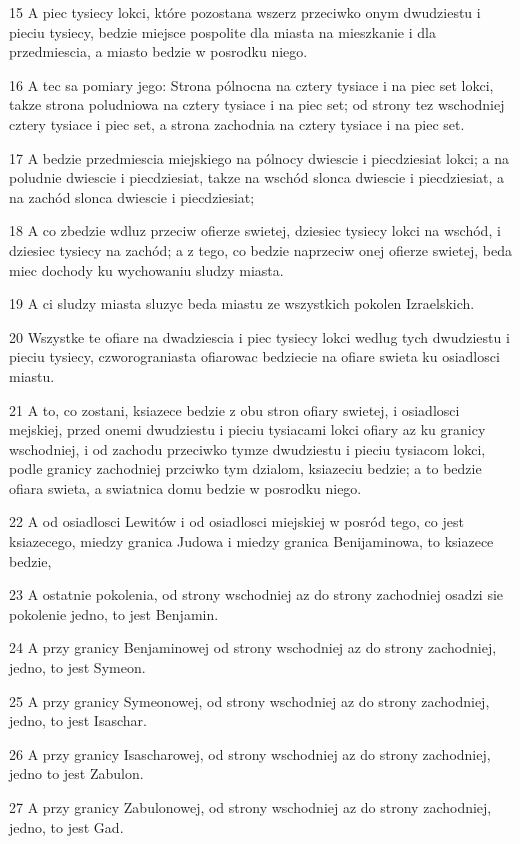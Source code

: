 \par 15 A piec tysiecy lokci, które pozostana wszerz przeciwko onym dwudziestu i pieciu tysiecy, bedzie miejsce pospolite dla miasta na mieszkanie i dla przedmiescia, a miasto bedzie w posrodku niego.
\par 16 A tec sa pomiary jego: Strona pólnocna na cztery tysiace i na piec set lokci, takze strona poludniowa na cztery tysiace i na piec set; od strony tez wschodniej cztery tysiace i piec set, a strona zachodnia na cztery tysiace i na piec set.
\par 17 A bedzie przedmiescia miejskiego na pólnocy dwiescie i piecdziesiat lokci; a na poludnie dwiescie i piecdziesiat, takze na wschód slonca dwiescie i piecdziesiat, a na zachód slonca dwiescie i piecdziesiat;
\par 18 A co zbedzie wdluz przeciw ofierze swietej, dziesiec tysiecy lokci na wschód, i dziesiec tysiecy na zachód; a z tego, co bedzie naprzeciw onej ofierze swietej, beda miec dochody ku wychowaniu sludzy miasta.
\par 19 A ci sludzy miasta sluzyc beda miastu ze wszystkich pokolen Izraelskich.
\par 20 Wszystke te ofiare na dwadziescia i piec tysiecy lokci wedlug tych dwudziestu i pieciu tysiecy, czworograniasta ofiarowac bedziecie na ofiare swieta ku osiadlosci miastu.
\par 21 A to, co zostani, ksiazece bedzie z obu stron ofiary swietej, i osiadlosci mejskiej, przed onemi dwudziestu i pieciu tysiacami lokci ofiary az ku granicy wschodniej, i od zachodu przeciwko tymze dwudziestu i pieciu tysiacom lokci, podle granicy zachodniej przciwko tym dzialom, ksiazeciu bedzie; a to bedzie ofiara swieta, a swiatnica domu bedzie w posrodku niego.
\par 22 A od osiadlosci Lewitów i od osiadlosci miejskiej w posród tego, co jest ksiazecego, miedzy granica Judowa i miedzy granica Benijaminowa, to ksiazece bedzie,
\par 23 A ostatnie pokolenia, od strony wschodniej az do strony zachodniej osadzi sie pokolenie jedno, to jest Benjamin.
\par 24 A przy granicy Benjaminowej od strony wschodniej az do strony zachodniej, jedno, to jest Symeon.
\par 25 A przy granicy Symeonowej, od strony wschodniej az do strony zachodniej, jedno, to jest Isaschar.
\par 26 A przy granicy Isascharowej, od strony wschodniej az do strony zachodniej, jedno to jest Zabulon.
\par 27 A przy granicy Zabulonowej, od strony wschodniej az do strony zachodniej, jedno, to jest Gad.
